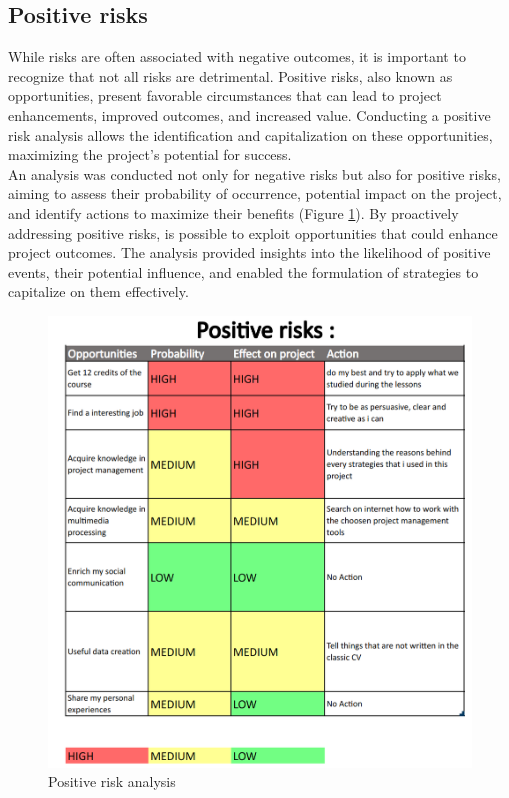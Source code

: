 \documentclass[eng]{class}
\begin{document}
\subsection{Positive risks}
While risks are often associated with negative outcomes, it is important to recognize that not all risks are detrimental.
Positive risks, also known as opportunities, present favorable circumstances that can lead to project enhancements, improved outcomes, and increased value.
Conducting a positive risk analysis allows the identification and capitalization on these opportunities, maximizing the project's potential for success.\\
An analysis was conducted not only for negative risks but also for positive risks, aiming to assess their probability of occurrence,
potential impact on the project, and identify actions to maximize their benefits (Figure \ref{fig-5}).
By proactively addressing positive risks, is possible to exploit opportunities that could enhance project outcomes.
The analysis provided insights into the likelihood of positive events, their potential influence, and enabled the formulation of strategies to
capitalize on them effectively.
\begin{figure}[h!]
  \centering
  \includegraphics[width=\columnwidth]{images/positive risks.png}
  \caption{Positive risk analysis}
  \label{fig-5}
\end{figure}
\end{document}
